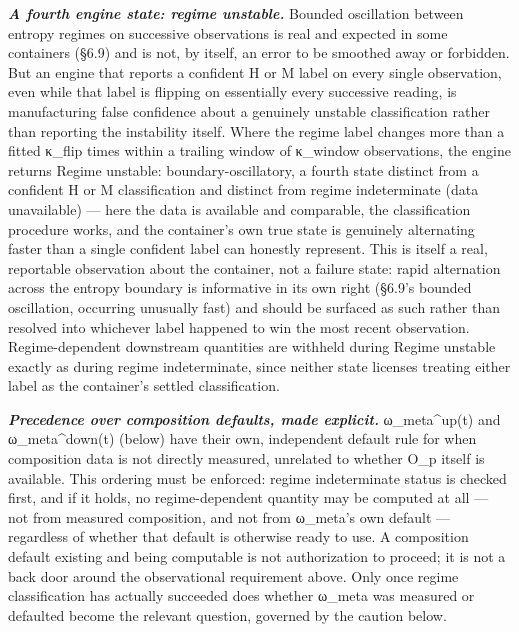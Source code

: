 \documentclass[
]{article}
\begin{document}
\emph{\textbf{A fourth engine state: regime unstable.}} Bounded
oscillation between entropy regimes on successive observations is real
and expected in some containers (§6.9) and is not, by itself, an error
to be smoothed away or forbidden. But an engine that reports a confident
H or M label on every single observation, even while that label is
flipping on essentially every successive reading, is manufacturing false
confidence about a genuinely unstable classification rather than
reporting the instability itself. Where the regime label changes more
than a fitted κ\_flip times within a trailing window of κ\_window
observations, the engine returns Regime unstable: boundary-oscillatory,
a fourth state distinct from a confident H or M classification and
distinct from regime indeterminate (data unavailable) --- here the data
is available and comparable, the classification procedure works, and the
container's own true state is genuinely alternating faster than a single
confident label can honestly represent. This is itself a real,
reportable observation about the container, not a failure state: rapid
alternation across the entropy boundary is informative in its own right
(§6.9's bounded oscillation, occurring unusually fast) and should be
surfaced as such rather than resolved into whichever label happened to
win the most recent observation. Regime-dependent downstream quantities
are withheld during Regime unstable exactly as during regime
indeterminate, since neither state licenses treating either label as the
container's settled classification.

\emph{\textbf{Precedence over composition defaults, made explicit.}}
ω\_meta\^{}up(t) and ω\_meta\^{}down(t) (below) have their own,
independent default rule for when composition data is not directly
measured, unrelated to whether O\_p itself is available. This ordering
must be enforced: regime indeterminate status is checked first, and if
it holds, no regime-dependent quantity may be computed at all --- not
from measured composition, and not from ω\_meta's own default ---
regardless of whether that default is otherwise ready to use. A
composition default existing and being computable is not authorization
to proceed; it is not a back door around the observational requirement
above. Only once regime classification has actually succeeded does
whether ω\_meta was measured or defaulted become the relevant question,
governed by the caution below.
\end{document}
